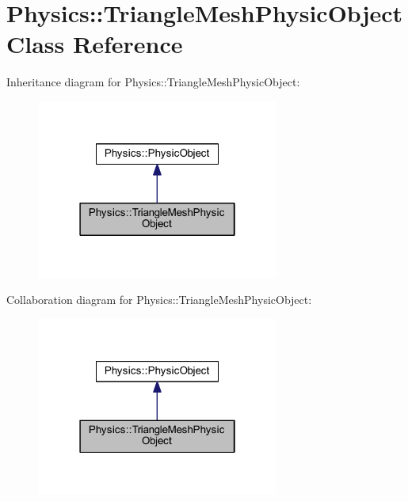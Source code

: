 \hypertarget{class_physics_1_1_triangle_mesh_physic_object}{}\section{Physics\+:\+:Triangle\+Mesh\+Physic\+Object Class Reference}
\label{class_physics_1_1_triangle_mesh_physic_object}


Inheritance diagram for Physics\+:\+:Triangle\+Mesh\+Physic\+Object\+:
\nopagebreak
\begin{figure}[H]
\begin{center}
\leavevmode
\includegraphics[width=226pt]{class_physics_1_1_triangle_mesh_physic_object__inherit__graph}
\end{center}
\end{figure}


Collaboration diagram for Physics\+:\+:Triangle\+Mesh\+Physic\+Object\+:
\nopagebreak
\begin{figure}[H]
\begin{center}
\leavevmode
\includegraphics[width=226pt]{class_physics_1_1_triangle_mesh_physic_object__coll__graph}
\end{center}
\end{figure}
